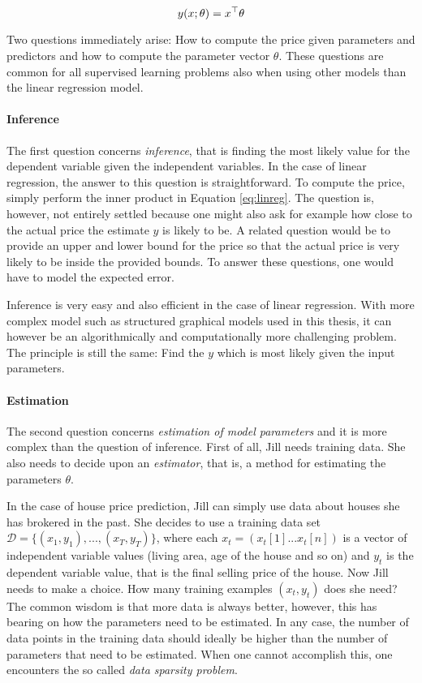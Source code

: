 \begin{equation}
y(x\mbox{$ ; \, $} \theta) = x^\top\theta\label{eq:linreg}
\end{equation}

Two questions immediately arise: How to compute the price given
parameters and predictors and how to compute the parameter vector
$\theta$. These questions are common for all supervised learning
problems also when using other models than the linear regression
model.

\paragraph{Inference} The first question concerns {\it inference},
that is finding the most likely value for the dependent variable given
the independent variables. In the case of linear regression, the
answer to this question is straightforward. To compute the price,
simply perform the inner product in Equation \ref{eq:linreg}. The
question is, however, not entirely settled because one might also ask
for example how close to the actual price the estimate $y$ is likely
to be. A related question would be to provide an upper and lower bound
for the price so that the actual price is very likely to be inside the
provided bounds. To answer these questions, one would have to model
the expected error.

Inference is very easy and also efficient in the case of linear
regression. With more complex model such as structured graphical
models used in this thesis, it can however be an algorithmically and
computationally more challenging problem. The principle is still the
same: Find the $y$ which is most likely given the input parameters.

\paragraph{Estimation} The second question concerns {\it estimation of
  model parameters} and it is more complex than the question of
inference. First of all, Jill needs training data. She also needs to
decide upon an {\it estimator}, that is, a method for estimating the
parameters $\theta$.

In the case of house price prediction, Jill can simply use data about
houses she has brokered in the past. She decides to use a training
data set $\mathcal{D} = \{(x_1, y_1), ..., (x_T, y_T)\}$, where each
$x_t = (x_t[1] ... x_t[n])$ is a vector of independent variable values
(living area, age of the house and so on) and $y_t$ is the dependent
variable value, that is the final selling price of the house. Now Jill
needs to make a choice. How many training examples $(x_t, y_t)$ does
she need? The common wisdom is that more data is always better,
however, this has bearing on how the parameters need to be
estimated. In any case, the number of data points in the training data
should ideally be higher than the number of parameters that need to be
estimated. When one cannot accomplish this, one encounters the so
called {\it data sparsity problem}.

